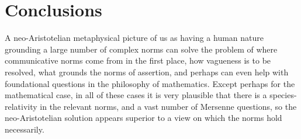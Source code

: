 \section{Conclusions}
A neo-Aristotelian metaphysical picture of us as having a human nature grounding a large number of complex
norms can solve the problem of where communicative norms come from in the first place, how vagueness
is to be resolved, what grounds the norms of assertion, and perhaps can even help with foundational
questions in the philosophy of mathematics. Except perhaps for the mathematical case, in all of these cases
it is very plausible that there is a species-relativity in the relevant norms, and a vast number of 
Mersenne questions, so the neo-Aristotelian solution appears superior to a view on which the norms hold necessarily.

\chaptertail

